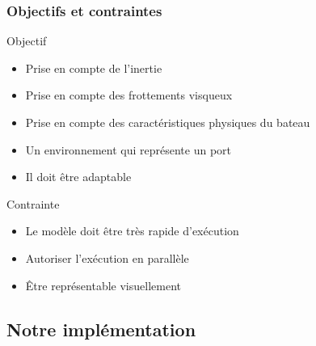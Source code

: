 \documentclass[8pt]{beamer}
\begin{document}
\begin{frame}

  \frametitle{Objectifs et contraintes}

\begin{block}{Objectif}
    \begin{itemize}
    \item Prise en compte de l'inertie
    \item Prise en compte des frottements visqueux
    \item Prise en compte des caractéristiques physiques du bateau
    \item Un environnement qui représente un port
    \item Il doit être adaptable 
    \end{itemize}
\end{block}

\pause

\begin{block}{Contrainte}
    \begin{itemize}
    \item Le modèle doit être très rapide d'exécution
    \item Autoriser l'exécution en parallèle
    \item Être représentable visuellement
    \end{itemize}
\end{block}

\end{frame}

\subsection{Notre implémentation}
\end{document}
